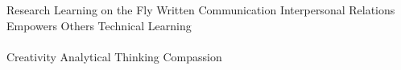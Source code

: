 


\begin{cventries}

\cventry
{} %
{} %
{} %
{} %
{ %
\begin{cvitems}
Research \quad Learning on the Fly \quad Written Communication \quad Interpersonal Relations \quad Empowers Others \quad Technical Learning
\\
\\
Creativity \quad Analytical Thinking \quad Compassion
\end{cvitems} 
}




\end{cventries}